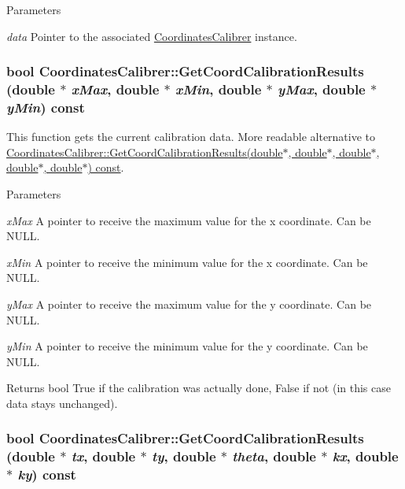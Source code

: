 \begin{DoxyParams}{Parameters}
\item[{\em data}]Pointer to the associated \hyperlink{classCoordinatesCalibrer}{CoordinatesCalibrer} instance. \end{DoxyParams}
\hypertarget{classCoordinatesCalibrer_a1a3ae703556c2f4c4455792a43fed987}{
\subsubsection[{GetCoordCalibrationResults}]{\setlength{\rightskip}{0pt plus 5cm}bool CoordinatesCalibrer::GetCoordCalibrationResults (double $\ast$ {\em xMax}, \/  double $\ast$ {\em xMin}, \/  double $\ast$ {\em yMax}, \/  double $\ast$ {\em yMin}) const}}
\label{classCoordinatesCalibrer_a1a3ae703556c2f4c4455792a43fed987}


This function gets the current calibration data. More readable alternative to \hyperlink{classCoordinatesCalibrer_a92672252bda26bddd9b8c73bc6395ea3}{CoordinatesCalibrer::GetCoordCalibrationResults(double$\ast$, double$\ast$, double$\ast$, double$\ast$, double$\ast$) const}. 


\begin{DoxyParams}{Parameters}
\item[{\em xMax}]A pointer to receive the maximum value for the x coordinate. Can be NULL. \item[{\em xMin}]A pointer to receive the minimum value for the x coordinate. Can be NULL. \item[{\em yMax}]A pointer to receive the maximum value for the y coordinate. Can be NULL. \item[{\em yMin}]A pointer to receive the minimum value for the y coordinate. Can be NULL. \end{DoxyParams}
\begin{DoxyReturn}{Returns}
bool True if the calibration was actually done, False if not (in this case data stays unchanged). 
\end{DoxyReturn}
\hypertarget{classCoordinatesCalibrer_a92672252bda26bddd9b8c73bc6395ea3}{
\subsubsection[{GetCoordCalibrationResults}]{\setlength{\rightskip}{0pt plus 5cm}bool CoordinatesCalibrer::GetCoordCalibrationResults (double $\ast$ {\em tx}, \/  double $\ast$ {\em ty}, \/  double $\ast$ {\em theta}, \/  double $\ast$ {\em kx}, \/  double $\ast$ {\em ky}) const}}
\label{classCoordinatesCalibrer_a92672252bda26bddd9b8c73bc6395ea3}



